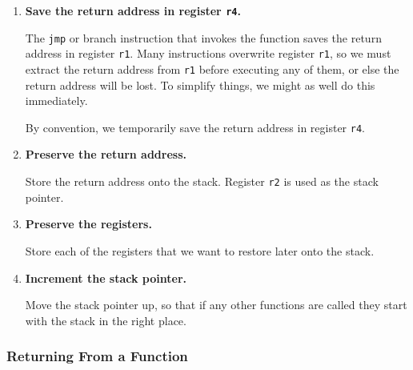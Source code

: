 \documentclass[makeidx,psfig]{article}
\begin{document}
\begin{enumerate}

\item {\bf Save the return address in register {\tt r4}.}

	The {\tt jmp} or branch instruction that invokes the function
	saves the return address in register {\tt r1}.  Many
	instructions overwrite register {\tt r1}, so we must extract
	the return address from {\tt r1} before executing any of them,
	or else the return address will be lost.  To simplify things,
	we might as well do this immediately.

	By convention, we temporarily save the return address in
	register {\tt r4}.


\item {\bf Preserve the return address.}

	Store the return address onto the stack.  Register {\tt r2}
	is used as the stack pointer.

\item {\bf Preserve the registers.}

	Store each of the registers that we want to restore later onto
	the stack.

\item {\bf Increment the stack pointer.}

	Move the stack pointer up, so that if any other functions
	are called they start with the stack in the right place.

\end{enumerate}

\subsubsection{Returning From a Function}
\end{document}
